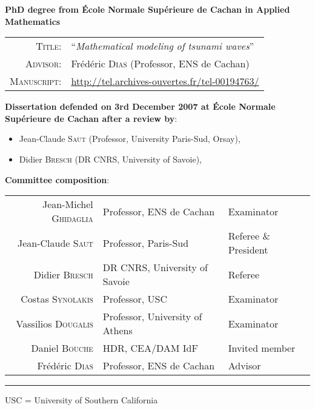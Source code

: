 \documentclass[final, a4paper, oneside, 12pt]{article}
\numberwithin{equation}{section}
\begin{document}
\textbf{PhD degree from \'{E}cole Normale Sup\'erieure de Cachan in Applied Mathematics}

\vspace{1em}

\begin{tabular}{rl}
  \textsc{Title}: & ``\textit{Mathematical modeling of tsunami waves}'' \\
  \textsc{Advisor}: & Fr\'ed\'eric \textsc{Dias} (Professor, ENS de Cachan) \\
  \textsc{Manuscript:} & \url{http://tel.archives-ouvertes.fr/tel-00194763/}
\end{tabular}

\vspace{0.4cm}

\textbf{Dissertation defended on 3rd December 2007 at \'{E}cole Normale Sup\'erieure de Cachan after a review by}:

\vspace{0.5em}

\begin{itemize}
  \item Jean-Claude \textsc{Saut} (Professor, University Paris-Sud, Orsay),
  \item Didier \textsc{Bresch} (DR CNRS, University of Savoie),
\end{itemize}

\vspace{1em}

\textbf{Committee composition}:

\vspace{1em}

\begin{tabular}{rll}
  Jean-Michel \textsc{Ghidaglia} & Professor, ENS de Cachan & Examinator \\
  Jean-Claude \textsc{Saut} & Professor, Paris-Sud & Referee \& President \\
  Didier \textsc{Bresch} & DR CNRS, University of Savoie & Referee \\
  Costas \textsc{Synolakis} & Professor, USC & Examinator \\
  Vassilios \textsc{Dougalis} & Professor, University of Athens & Examinator \\
  Daniel \textsc{Bouche} & HDR, CEA/DAM IdF & Invited member \\
  Fr\'ed\'eric \textsc{Dias} & Professor, ENS de Cachan & Advisor
\end{tabular}
\vspace{7pt}
\hrule width 3cm
\vspace{7pt}
USC = University of Southern California
\end{document}
